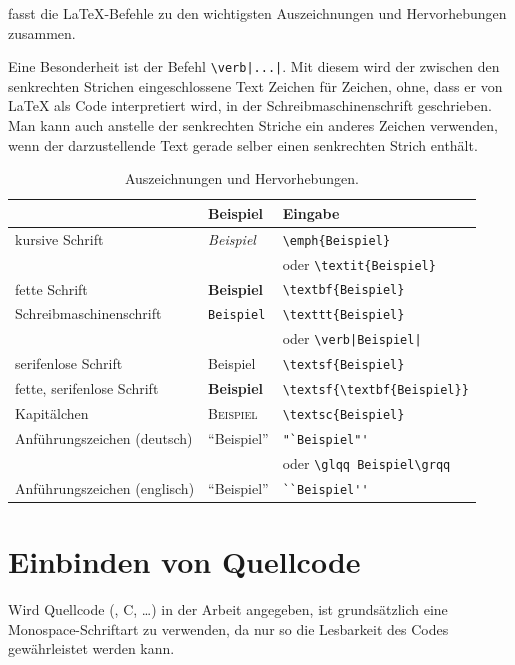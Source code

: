  fasst die \LaTeX-Befehle zu den wichtigsten Auszeichnungen und Hervorhebungen zusammen.

Eine Besonderheit ist der Befehl \verb!\verb|...|!. Mit diesem wird der zwischen den senkrechten Strichen eingeschlossene Text Zeichen für Zeichen, \dah ohne, dass er von \LaTeX{} als Code interpretiert wird, in der Schreibmaschinenschrift geschrieben.
Man kann auch anstelle der senkrechten Striche ein anderes Zeichen verwenden, wenn der darzustellende Text gerade selber einen senkrechten Strich enthält.

\begin{table}
  \caption{Auszeichnungen und Hervorhebungen.}
  \label{tab:Hervorhebungen}
  \setlength{\tabcolsep}{1em}\centering
  \begin{tabular}{lll}
    \toprule
          &  Beispiel        &  Eingabe\\
    \midrule
    kursive Schrift      &  \emph{Beispiel}      &  \verb*|\emph{Beispiel}| \\
    & & oder \verb*|\textit{Beispiel}|\\
    fette Schrift      &  \textbf{Beispiel}      &  \verb*|\textbf{Beispiel}|\\
    Schreibmaschinenschrift      &  \texttt{Beispiel}      &  \verb*|\texttt{Beispiel}| \\
    & & oder \verb*!\verb|Beispiel|! \\
    serifenlose Schrift  &  \textsf{Beispiel}      &  \verb*|\textsf{Beispiel}|\\
    fette, serifenlose Schrift  &  \textsf{\textbf{Beispiel}}      &  \verb*|\textsf{\textbf{Beispiel}}|\\
    Kapitälchen      &  \textsc{Beispiel}      &  \verb*|\textsc{Beispiel}|\\
    Anführungszeichen (deutsch) &  "`Beispiel"'      &  \verb*|"`Beispiel"'| \\
    & &  oder \verb*|\glqq Beispiel\grqq|\\
    Anführungszeichen (englisch) &  ``Beispiel''    &  \verb*|``Beispiel''|\\
    \bottomrule
  \end{tabular}
\end{table}



\section{Einbinden von Quellcode}
Wird Quellcode (\Matlab{}, C, \ldots) in der Arbeit angegeben, ist grundsätzlich eine Monospace-Schriftart zu verwenden, da nur so die Lesbarkeit des Codes
gewährleistet werden kann.

